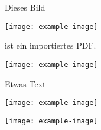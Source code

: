 \documentclass{article}
\begin{document}
Dieses Bild
\begin{center}
    \texttt{[image: example-image]}
\end{center}
ist ein importiertes PDF.\@
\newpage
\begin{center}
    \texttt{[image: example-image]}
\end{center}
Etwas Text
\begin{center}
    \texttt{[image: example-image]}
\end{center}

\newpage

\begin{center}
    \texttt{[image: example-image]}
\end{center}
\end{document}
